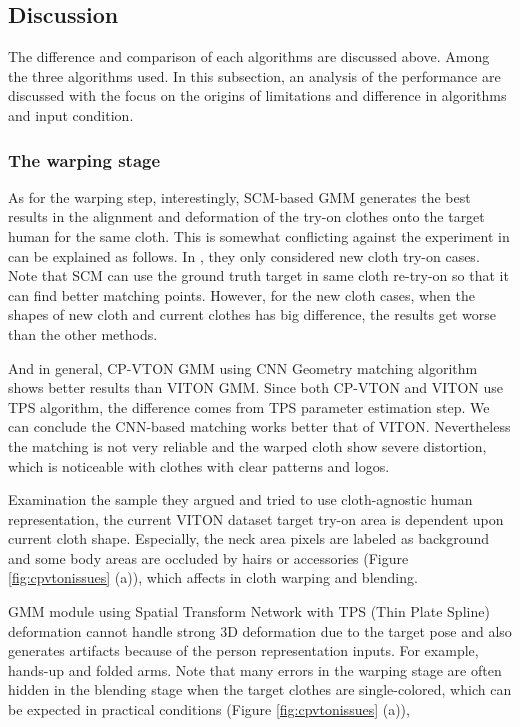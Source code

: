  
\subsection{Discussion}

The difference and comparison of each algorithms are discussed above.
Among the three algorithms used. In this subsection, an analysis of the performance are discussed with the focus on the origins of limitations and difference in algorithms and input condition.  

\subsubsection{The warping stage}

As for the warping step, interestingly, SCM-based GMM generates the best results in the alignment and deformation of the try-on clothes onto the target human for the same cloth. This is somewhat conflicting against the experiment in \cite{Wang2018TowardCI} can be explained as follows. In \cite{Wang2018TowardCI}, they only considered new cloth try-on cases.  Note that SCM can use the ground truth target in same cloth re-try-on so that it can find better matching points. However, for the new cloth cases, when the shapes of new cloth and current clothes has big difference, the results get worse than the other methods.
  
And in general, CP-VTON GMM using CNN Geometry matching algorithm shows better results than VITON GMM. Since both CP-VTON and VITON use TPS algorithm, the difference comes from TPS parameter estimation step. We can conclude the CNN-based matching works better that of VITON. Nevertheless the matching is not very reliable and the warped cloth show severe distortion, which is noticeable with clothes with clear patterns and logos. 

Examination the sample they argued and tried to use cloth-agnostic human representation, the current VITON dataset target try-on area is dependent upon current cloth shape. Especially, the neck area pixels are labeled as background and some body areas are occluded by hairs or accessories (Figure \ref{fig:cpvtonissues} (a)), which affects in cloth warping and blending. 

GMM module using Spatial Transform Network\cite{JaderbergSZK15} with TPS (Thin Plate Spline)\cite{Bookstein1989PrincipalWT} deformation cannot handle strong 3D deformation due to the target pose and also generates artifacts because of the person representation inputs. For example, hands-up and folded arms.  Note that many errors in the warping stage are often hidden in the blending stage when the target clothes are single-colored, which can be expected in practical conditions (Figure \ref{fig:cpvtonissues} (a)),


